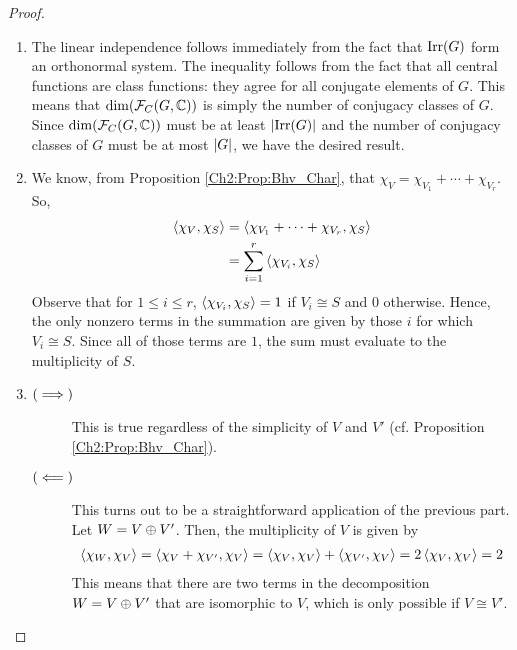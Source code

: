\begin{proof}
    \hfill
    \begin{enumerate}[label = \normalfont \arabic*.]
        \item The linear independence follows immediately from the fact that $\operatorname{Irr}\!\left( G \right)$ form an orthonormal system. The inequality follows from the fact that all central functions are class functions: they agree for all conjugate elements of $G$. This means that $\dim\!\left( \mathcal{F}_C\!\left( G, \mathbb{C} \right) \right)$ is simply the number of conjugacy classes of $G$. Since $\dim\!\left( \mathcal{F}_C\!\left( G, \mathbb{C} \right) \right)$ must be at least $\left\lvert \operatorname{Irr}\!\left( G \right) \right\rvert$ and the number of conjugacy classes of $G$ must be at most $\left\lvert G \right\rvert$, we have the desired result.
        
        \item We know, from Proposition \ref{Ch2:Prop:Bhv_Char}, that $\chi_V = \chi_{V_1} + \cdots + \chi_{V_r}$. So,
        \begin{align*}
            \left\langle \chi_V, \chi_S \right\rangle &= \left\langle \chi_{V_1} + \cdots + \chi_{V_r}, \chi_S \right\rangle \\
            &= \sum_{i=1}^{r} \left\langle \chi_{V_i}, \chi_S \right\rangle
        \end{align*}
        Observe that for $1 \leq i \leq r$, $\left\langle \chi_{V_i}, \chi_S \right\rangle = 1$ if $V_i \cong S$ and $0$ otherwise. Hence, the only nonzero terms in the summation are given by those $i$ for which $V_i \cong S$. Since all of those terms are $1$, the sum must evaluate to the multiplicity of $S$.

        \item 
        \begin{description}
            \item[$\left( \implies \right)$] This is true regardless of the simplicity of $V$ and $V'$ (cf. Proposition \ref{Ch2:Prop:Bhv_Char}).
            \item[$\left( \impliedby \right)$] This turns out to be a straightforward application of the previous part. Let $W = V \oplus V'$. Then, the multiplicity of $V$ is given by
            \begin{align*}
                \left\langle \chi_W, \chi_V \right\rangle = \left\langle \chi_V + \chi_{V'}, \chi_V \right\rangle = \left\langle \chi_V, \chi_V \right\rangle + \left\langle \chi_{V'}, \chi_V \right\rangle = 2\left\langle \chi_V, \chi_V \right\rangle = 2 
            \end{align*}
            This means that there are two terms in the decomposition $W = V \oplus V'$ that are isomorphic to $V$, which is only possible if $V \cong V'$.
        \end{description}


\end{enumerate}
\end{proof}
